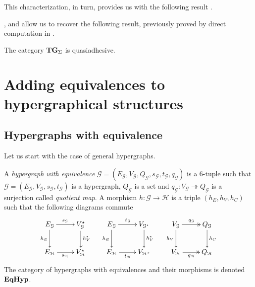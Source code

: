 \documentclass[a4paper,UKenglish,cleveref,pdftex,thm-restate,numberwithinsect]{lipics-v2021}
\newcommand{\catname}[1]{\textbf{\textup{#1}}}
\newcommand{\hyp}{\catname{Hyp}}
\newcommand{\EqHyp}{\catname{EqHyp}} %
\newcommand{\tg}[0]{\catname{TG}_{\Sigma}}
\newcommand{\eto}{\twoheadrightarrow}
\begin{document}
This characterization, in turn, provides us with the following result \cite{CastelnovoGM24,castelnovo2023thesis}. 



,  and  allow us to recover the following result, previously proved by direct computation in \cite[Thm.~4.2]{CorradiniG05}.
\begin{corollary}
	The category $\tg$ is quasiadhesive.
\end{corollary}

\section{Adding equivalences to hypergraphical structures}
\label{hypereq}

\subsection{Hypergraphs with equivalence}

Let us start with the case of general hypergraphs.

\begin{definition}
	A \emph{hypergraph with equivalence} $\mathcal{G} = (E_\mathcal{G}, V_{\mathcal{G}}, Q_\mathcal{G}, s_\mathcal{G}, t_\mathcal{G}, q_\mathcal{G})$ is a 6-tuple such that $\mathcal{G} = (E_\mathcal{G}, V_{\mathcal{G}}, s_\mathcal{G}, t_\mathcal{G})$ is a hypergraph, $Q_\mathcal{G}$ is a set and $q_{\mathcal{G}}: V_{\mathcal{G}}\eto Q_{\mathcal{G}}$ is a surjection called \emph{quotient map}. 
	A morphism $h\colon \mathcal{G\to H}$ is a triple $(h_E, h_V, h_C)$ such that the following diagrams commute
	\[\xymatrix{
		{E_\mathcal{G}}\ar[r]^{s_\mathcal{G}}\ar[d]_{h_E} & {V_{\mathcal{G}}^\star}\ar[d]^{h_V^\star} & {E_\mathcal{G}}\ar[r]^{t_\mathcal{G}}\ar[d]_{h_E} & {V_{\mathcal{G}^\star}}\ar[d]^{h_V^\star} & {V_\mathcal{G}}\ar@{>>}[r]^{q_\mathcal{G}}\ar[d]_{h_V} & {Q_{\mathcal{G}}} \ar[d]^{h_C} \\
		{E_\mathcal{H}}\ar[r]_{s_\mathcal{H}} & {V_{\mathcal{H}}^\star}	& {E_\mathcal{H}}\ar[r]_{t_\mathcal{H}} & {V_{\mathcal{H}^\star}}& {V_\mathcal{H}}\ar@{>>}[r]_{q_\mathcal{H}} & {Q_\mathcal{H}}
	}\]
	The category of hypergraphs with equivalences and their morphisms is denoted $\EqHyp$.
	
\end{definition}
\end{document}
